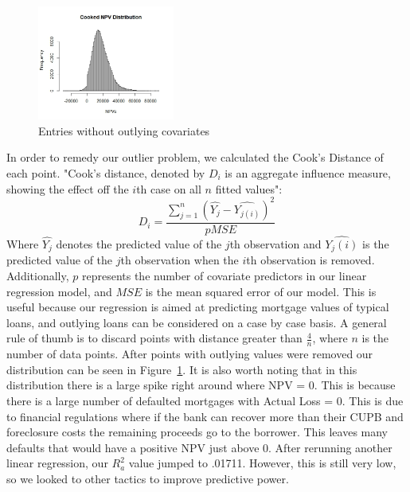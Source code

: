 \documentclass[12 pt]{uncw_thesis}
\theoremstyle{plain}
\theoremstyle{remark}
\theoremstyle{definition}
\begin{document}
\begin{figure}
	\vspace{-\normalbaselineskip}
	\centering
	\includegraphics[width=0.4\textwidth]{images/Cooked.jpeg}
	\caption{Entries without outlying covariates}
	\label{fig:Cooks}
	\vspace{-\normalbaselineskip}
\end{figure}
In order to remedy our outlier problem, we calculated the Cook's Distance of each point. "Cook's distance, denoted by $D_i$ is an aggregate influence measure, showing the effect off the $i$th case on all $n$ fitted values":
\[D_i = \frac{\sum_{j=1}^n(\hat{Y_j}-\hat{Y_{j(i)}})^2}{pMSE}\]
Where $\hat{Y_j}$ denotes the predicted value of the $j$th observation and $\hat{Y_j(i)}$ is the predicted value of the $j$th observation when the $i$th observation is removed. Additionally, $p$ represents the number of covariate predictors in our linear regression model, and $MSE$ is the mean squared error of our model\cite{512}.
This is useful because our regression is aimed at predicting mortgage values of typical loans, and outlying loans can be considered on a case by case basis. A general rule of thumb is to discard points with distance greater than \(\frac{4}{n}\), where \(n\) is the number of data points\cite{Cook's Rule}. After points with outlying values were removed our distribution can be seen in Figure~\ref{fig:Cooks}. It is also worth noting that in this distribution there is a large spike right around where NPV = 0. This is because there is a large number of  defaulted mortgages with Actual Loss = 0. This is due to financial regulations where if the bank can recover more than their CUPB and foreclosure costs the remaining proceeds go to the borrower. This leaves many defaults that would have a positive NPV just above 0. After rerunning another linear regression, our \(R^2_a\) value jumped to .01711. However, this is still very low, so we looked to other tactics to improve predictive power.
\end{document}
